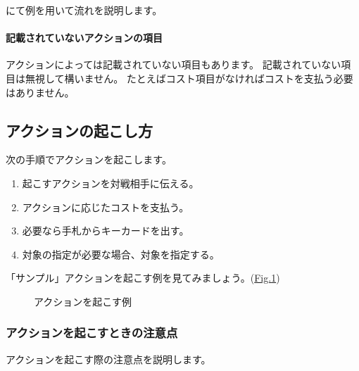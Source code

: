 \documentclass[letterpaper,10pt,dvipdfmx]{sphinxmanual}
\begin{document}
{\hyperref[\detokenize{common/03-action:action-flow}]{}} にて例を用いて流れを説明します。


\paragraph{記載されていないアクションの項目}
\label{\detokenize{common/03-action:id5}}
アクションによっては記載されていない項目もあります。
記載されていない項目は無視して構いません。
たとえばコスト項目がなければコストを支払う必要はありません。


\subsection{アクションの起こし方}
\label{\detokenize{common/03-action:action-howto}}\label{\detokenize{common/03-action:id6}}
次の手順でアクションを起こします。
\begin{enumerate}
%
\item {} 
起こすアクションを対戦相手に伝える。

\item {} 
アクションに応じたコストを支払う。

\item {} 
必要なら手札からキーカードを出す。

\item {} 
対象の指定が必要な場合、対象を指定する。

\end{enumerate}

「サンプル」アクションを起こす例を見てみましょう。(\hyperref[\detokenize{common/03-action:action-sample2}]{Fig.\@ \ref{\detokenize{common/03-action:action-sample2}}})

\begin{figure}[htbp]
\centering
\capstart

\noindent{}
\caption{アクションを起こす例}\label{\detokenize{common/03-action:id34}}\label{\detokenize{common/03-action:action-sample2}}\end{figure}


\subsubsection{アクションを起こすときの注意点}
\label{\detokenize{common/03-action:id7}}
アクションを起こす際の注意点を説明します。
\end{document}
